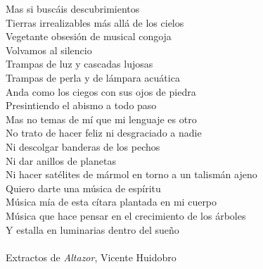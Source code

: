 \documentclass[hyphens]{umemoria}
\begin{document}

\begin{dedicatoria}


Mas si buscáis descubrimientos\\
Tierras irrealizables más allá de los cielos\\
Vegetante obsesión de musical congoja\\
Volvamos al silencio\\
Trampas de luz y cascadas lujosas\\
Trampas de perla y de lámpara acuática\\
Anda como los ciegos con sus ojos de piedra\\
Presintiendo el abismo a todo paso\\
Mas no temas de mí que mi lenguaje es otro\\
No trato de hacer feliz ni desgraciado a nadie\\
Ni descolgar banderas de los pechos\\
Ni dar anillos de planetas\\
Ni hacer satélites de mármol en torno a un talismán ajeno\\
Quiero darte una música de espíritu\\
Música mía de esta cítara plantada en mi cuerpo\\
Música que hace pensar en el crecimiento de los árboles\\
Y estalla en luminarias dentro del sueño\\
\textnormal{\\Extractos de \textit{Altazor}, Vicente Huidobro}
\end{dedicatoria}
\end{document}
